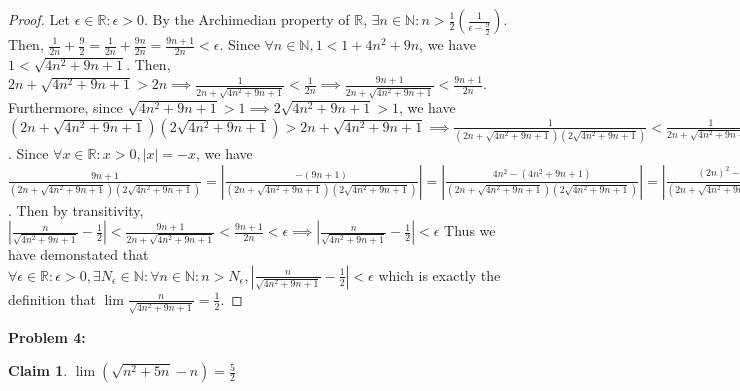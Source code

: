 \documentclass{article}
\newcommand{\reals}{\ensuremath{\mathbb{R}}}
\newcommand{\nats}{\ensuremath{\mathbb{N}}}
\newcommand{\eps}{\ensuremath{\epsilon}}
\newcommand{\neps}{\ensuremath{N_\epsilon}}
\newcommand{\csn}{\sqrt{4n^2+9n+1}}
\newcommand{\dsn}{\sqrt{n^2 + 5n}}
\newtheorem{clm}{Claim}
\begin{document}
\begin{proof}
	Let $\eps \in \reals: \eps > 0$.
	By the Archimedian property of \reals,
	$\exists n \in \nats: n > \frac{1}{2}(\frac{1}{\eps - \frac{9}{2}})$.
	Then, $\frac{1}{2n} + \frac{9}{2} = \frac{1}{2n} + \frac{9n}{2n} = \frac{9n+1}{2n}< \eps$.
	Since $\forall n \in \nats, 1 < 1 + 4n^2 + 9n$, we have $1 < \csn$.
	Then, $2n + \csn > 2n \implies \frac{1}{2n + \csn} < \frac{1}{2n}
	\implies \frac{9n+1}{2n + \csn} < \frac{9n+1}{2n} $. 
	Furthermore, since $\csn > 1 \implies 2\csn > 1$,
	we have $(2n + \csn)(2\csn) > 2n + \csn \implies \frac{1}{(2n + \csn)(2\csn)} < \frac{1}{2n + \csn}
	\implies \frac{9n+1}{(2n + \csn)(2\csn)} < \frac{9n+1}{2n + \csn}$.
	Since $\forall x \in \reals: x > 0, |x| = -x$,
	we have $\frac{9n+1}{(2n + \csn)(2\csn)} = |\frac{-(9n+1)}{(2n + \csn)(2\csn)}|
	= |\frac{4n^2 -(4n^2 +9n+1)}{(2n + \csn)(2\csn)}| = |\frac{(2n)^2 - (\csn)^2}{(2n + \csn)(2\csn)}|
	= |\frac{2n - \csn}{2\csn}| = |\frac{n}{\csn} - \frac{1}{2}|$.
	Then by transitivity, $|\frac{n}{\csn} - \frac{1}{2}| < \frac{9n+1}{2n + \csn} < \frac{9n+1}{2n} < \eps
	\implies |\frac{n}{\csn} - \frac{1}{2}| < \eps$
	Thus we have demonstated that $\forall \eps \in \reals : \eps > 0, \exists \neps \in \nats:
	\forall n \in \nats: n > \neps,
	|\frac{n}{\csn} - \frac{1}{2}| < \eps$
	which is exactly the definition that
	$\lim \frac{n}{\csn} = \frac{1}{2}$.
\end{proof}

\textbf{Problem 4:}

\begin{clm} \label{c4}
	$\lim(\dsn - n) = \frac{5}{2}$
\end{clm}
\end{document}
